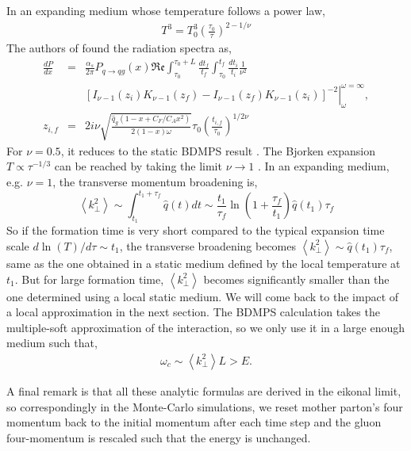 \documentclass[aps, prc, reprint, amsmath, groupedaddress, nofootinbib]{revtex4-1}
\begin{document}
{In an expanding medium whose temperature follows a power law,
\begin{eqnarray}
T^3 = T_0^3\left(\frac{\tau_0}{\tau}\right)^{2-1/\nu}
\end{eqnarray}
The authors of \cite{Baier:1998yf} found the radiation spectra as,
\begin{eqnarray}
\frac{dP}{dx} &=& \frac{\alpha_s}{2\pi}P_{q\rightarrow qg}(x)\mathfrak{Re}\int_{\tau_0}^{\tau_0+L}\frac{dt_f}{t_f}\int_{\tau_0}^{t_f}\frac{dt_i}{t_i} \frac{1}{\nu^2}\\
\nonumber
&& \left.\left[ I_{\nu-1}(z_i)K_{\nu-1}(z_f)-I_{\nu-1}(z_f)K_{\nu-1}(z_i)\right]^{-2}\right|_{\omega}^{\omega=\infty},\\
z_{i,f} &=& 2i\nu \sqrt{\frac{\hat{q}_g(1-x+C_F/C_A x^2)}{2(1-x)\omega}} \tau_0 \left( \frac{t_{i,f}}{\tau_0}\right) ^{1/2\nu}
\end{eqnarray}
For $\nu=0.5$, it reduces to the static BDMPS result \cite{Baier:1996kr}. 
The Bjorken expansion $T \propto \tau^{-1/3}$ can be reached by taking the limit $\nu \rightarrow 1$ \cite{PhysRevD.27.140}.
In an expanding medium, e.g. $\nu=1$, the transverse momentum broadening is,
\begin{equation}\label{eq:expanding-kt2}
\left\langle k_\perp^2\right\rangle \sim \int_{t_1}^{t_1+\tau_f
}\hat{q}(t)dt \sim \frac{t_1}{\tau_f}  \ln\left(1+\frac{\tau_f}{t_1}\right) \hat{q}(t_1)\tau_f
\end{equation}
So if the formation time is very short compared to the typical expansion time scale $d\ln(T)/d\tau \sim t_1$, the transverse broadening becomes $\left\langle k_\perp^2\right\rangle \sim \hat{q}(t_1)\tau_f$, same as the one obtained in a static medium defined by the local temperature at $t_1$.
But for large formation time, $\left\langle k_\perp^2\right\rangle$ becomes significantly smaller than the one determined using a local static medium.
We will come back to the impact of a local approximation in the next section. 
The BDMPS calculation takes the multiple-soft approximation of the interaction, so we only use it in a large enough medium such that,
\begin{eqnarray}\label{eq:BDMPS-requrement}
\omega_c \sim \left\langle k_\perp^2 \right\rangle L > E.
\end{eqnarray}


A final remark is that all these analytic formulas are derived in the eikonal limit, so correspondingly in the Monte-Carlo simulations, we reset mother parton's four momentum back to the initial momentum after each time step and the gluon four-momentum is rescaled such that the energy is unchanged.



}
\end{document}
